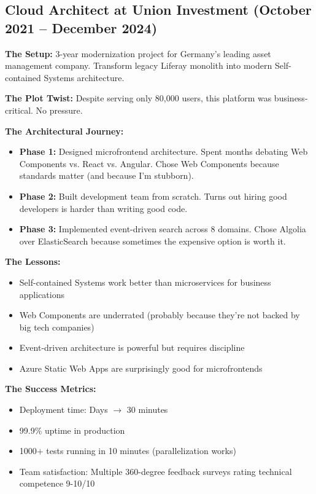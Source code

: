 \documentclass[11pt,a4paper]{article}
\begin{document}
\subsection{Cloud Architect at Union Investment (October 2021 -- December 2024)}
\textbf{The Setup:} 3-year modernization project for Germany's leading asset management company. Transform legacy Liferay monolith into modern Self-contained Systems architecture.

\textbf{The Plot Twist:} Despite serving only 80,000 users, this platform was business-critical. No pressure.

\textbf{The Architectural Journey:}
\begin{itemize}
\item \textbf{Phase 1:} Designed microfrontend architecture. Spent months debating Web Components vs. React vs. Angular. Chose Web Components because standards matter (and because I'm stubborn).
\item \textbf{Phase 2:} Built development team from scratch. Turns out hiring good developers is harder than writing good code.
\item \textbf{Phase 3:} Implemented event-driven search across 8 domains. Chose Algolia over ElasticSearch because sometimes the expensive option is worth it.
\end{itemize}

\textbf{The Lessons:}
\begin{itemize}
\item Self-contained Systems work better than microservices for business applications
\item Web Components are underrated (probably because they're not backed by big tech companies)
\item Event-driven architecture is powerful but requires discipline
\item Azure Static Web Apps are surprisingly good for microfrontends
\end{itemize}

\textbf{The Success Metrics:} 
\begin{itemize}
\item Deployment time: Days $\rightarrow$ 30 minutes
\item 99.9\% uptime in production
\item 1000+ tests running in 10 minutes (parallelization works)
\item Team satisfaction: Multiple 360-degree feedback surveys rating technical competence 9-10/10
\end{itemize}
\end{document}
